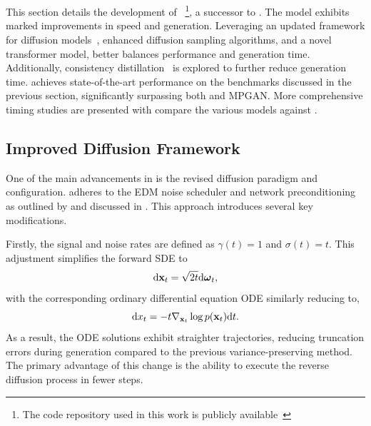 \FloatBarrier

\section{\pcdroid}

This section details the development of \pcdroid~\cite{PCDroid}\footnote{The code repository used in this work is publicly available~\cite{PCDroidCode}}, a successor to \pcjedi.
The \pcdroid model exhibits marked improvements in speed and generation.
Leveraging an updated framework for diffusion models~\cite{ElucidatingDesignSpace}, enhanced diffusion sampling algorithms, and a novel transformer model, \pcdroid better balances performance and generation time.
Additionally, consistency distillation~\cite{ConsistencyModels} is explored to further reduce generation time.
\pcdroid achieves state-of-the-art performance on the benchmarks discussed in the previous section, significantly surpassing both \pcjedi and MPGAN.
More comprehensive timing studies are presented with compare the various models against \pythia.

\subsection{Improved Diffusion Framework}

One of the main advancements in \pcdroid is the revised diffusion paradigm and configuration.
\pcdroid adheres to the EDM noise scheduler and network preconditioning as outlined by \textcite{ElucidatingDesignSpace} and discussed in .
This approach introduces several key modifications.

Firstly, the signal and noise rates are defined as $\gamma(t)=1$ and $\sigma(t)=t$.
This adjustment simplifies the forward SDE to
\begin{equation}
    \mathrm{d} \mathbf{x}_t = \sqrt{2t} \mathrm{d} \boldsymbol{\omega}_t,
\end{equation}
with the corresponding ordinary differential equation ODE similarly reducing to,
\begin{equation}
    \mathrm{d} x_t = - t \nabla_{\mathbf{x}_t} \log p(\mathbf{x}_t) \mathrm{d} t.
\end{equation}
As a result, the ODE solutions exhibit straighter trajectories, reducing truncation errors during generation compared to the previous variance-preserving method.
The primary advantage of this change is the ability to execute the reverse diffusion process in fewer steps.

